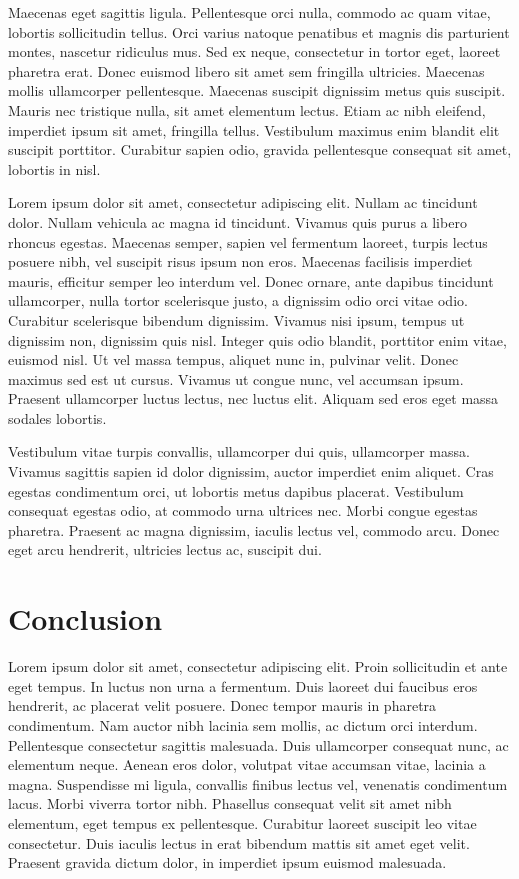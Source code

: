 \documentclass[a4paper,15pt]{article}
\begin{document}
Maecenas eget sagittis ligula. Pellentesque orci nulla, commodo ac quam vitae, lobortis sollicitudin tellus. Orci varius natoque penatibus et magnis dis parturient montes, nascetur ridiculus mus. Sed ex neque, consectetur in tortor eget, laoreet pharetra erat. Donec euismod libero sit amet sem fringilla ultricies. Maecenas mollis ullamcorper pellentesque. Maecenas suscipit dignissim metus quis suscipit. Mauris nec tristique nulla, sit amet elementum lectus. Etiam ac nibh eleifend, imperdiet ipsum sit amet, fringilla tellus. Vestibulum maximus enim blandit elit suscipit porttitor. Curabitur sapien odio, gravida pellentesque consequat sit amet, lobortis in nisl.

Lorem ipsum dolor sit amet, consectetur adipiscing elit. Nullam ac tincidunt dolor. Nullam vehicula ac magna id tincidunt. Vivamus quis purus a libero rhoncus egestas. Maecenas semper, sapien vel fermentum laoreet, turpis lectus posuere nibh, vel suscipit risus ipsum non eros. Maecenas facilisis imperdiet mauris, efficitur semper leo interdum vel. Donec ornare, ante dapibus tincidunt ullamcorper, nulla tortor scelerisque justo, a dignissim odio orci vitae odio. Curabitur scelerisque bibendum dignissim. Vivamus nisi ipsum, tempus ut dignissim non, dignissim quis nisl. Integer quis odio blandit, porttitor enim vitae, euismod nisl. Ut vel massa tempus, aliquet nunc in, pulvinar velit. Donec maximus sed est ut cursus. Vivamus ut congue nunc, vel accumsan ipsum. Praesent ullamcorper luctus lectus, nec luctus elit. Aliquam sed eros eget massa sodales lobortis.

Vestibulum vitae turpis convallis, ullamcorper dui quis, ullamcorper massa. Vivamus sagittis sapien id dolor dignissim, auctor imperdiet enim aliquet. Cras egestas condimentum orci, ut lobortis metus dapibus placerat. Vestibulum consequat egestas odio, at commodo urna ultrices nec. Morbi congue egestas pharetra. Praesent ac magna dignissim, iaculis lectus vel, commodo arcu. Donec eget arcu hendrerit, ultricies lectus ac, suscipit dui.

\section{Conclusion}

Lorem ipsum dolor sit amet, consectetur adipiscing elit. Proin sollicitudin et ante eget tempus. In luctus non urna a fermentum. Duis laoreet dui faucibus eros hendrerit, ac placerat velit posuere. Donec tempor mauris in pharetra condimentum. Nam auctor nibh lacinia sem mollis, ac dictum orci interdum. Pellentesque consectetur sagittis malesuada. Duis ullamcorper consequat nunc, ac elementum neque. Aenean eros dolor, volutpat vitae accumsan vitae, lacinia a magna. Suspendisse mi ligula, convallis finibus lectus vel, venenatis condimentum lacus. Morbi viverra tortor nibh. Phasellus consequat velit sit amet nibh elementum, eget tempus ex pellentesque. Curabitur laoreet suscipit leo vitae consectetur. Duis iaculis lectus in erat bibendum mattis sit amet eget velit. Praesent gravida dictum dolor, in imperdiet ipsum euismod malesuada.
\end{document}
